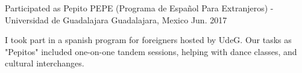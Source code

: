 \begin{cventries}
  \cventry
    {Participated as Pepito}
    {PEPE (Programa de Español Para Extranjeros) - Universidad de Guadalajara}
    {Guadalajara, Mexico}
    {Jun. 2017}
    {
      \begin{cvitems}
        \item {I took part in a spanish program for foreigners hosted by UdeG. Our tasks as "Pepitos" included one-on-one tandem sessions, helping with dance classes, and cultural interchanges.}
      \end{cvitems}
    }
\end{cventries}
